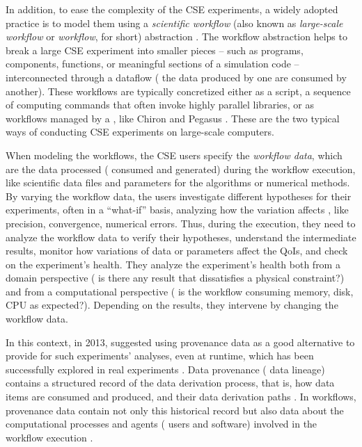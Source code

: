 In addition, to ease the complexity of the CSE experiments, a widely adopted practice is to model them using a \textit{scientific workflow} (also known as \textit{large-scale workflow} or \textit{workflow}, for short) abstraction \cite{F.daSilva2017characterization}.
The workflow abstraction helps to break a large CSE experiment into smaller pieces -- such as programs, components, functions, or meaningful sections of a simulation code -- interconnected through a dataflow (\ie{} the data produced by one are consumed by another).
These workflows are typically concretized either as a script, \ie{} a sequence of computing commands that often invoke highly parallel libraries, or as workflows managed by a ,
like Chiron \cite{Ogasawara2011algebraic} and Pegasus \cite{Deelman2015Pegasus}.
These are the two typical ways of conducting CSE experiments on large-scale computers.


When modeling the workflows, the CSE users specify the \textit{workflow data}, which are the data processed (\ie{} consumed and generated) during the workflow execution, like scientific data files and parameters for the algorithms or numerical methods. By varying the workflow data, the users investigate different hypotheses for their experiments, often in a ``what-if'' basis, analyzing how the variation affects , like precision, convergence, numerical errors.
Thus, during the execution, they need to analyze the workflow data to verify their hypotheses, understand the intermediate results, monitor how variations of data or parameters affect the QoIs, and check on the experiment's health.
 They analyze the experiment's health both from a domain perspective (\eg{} is there any result that dissatisfies a physical constraint?) and from a computational perspective (\eg{} is the workflow consuming memory, disk, CPU as expected?). 
 Depending on the results, they intervene by changing the workflow data. 
 
 In this context, in 2013, \citet{mattoso_user-steering_2013} suggested using provenance data as a good alternative to provide for such experiments’ analyses, even at runtime, which has been successfully explored in real experiments  \cite{Mattoso2015Dynamic, silva_adding_2018, Souza2017Data, Dias2015Data-centric, Camata2018In}. 
 Data provenance (\ie{} data lineage) contains a structured record of the data derivation process, that is, how data items are consumed and produced, and their data derivation paths  \cite{herschel_survey_2017}.
 In workflows, provenance data contain not only this historical record but also data about the computational processes and agents (\eg{} users and software) involved in the workflow execution \cite{Costa2013Capturing}.


